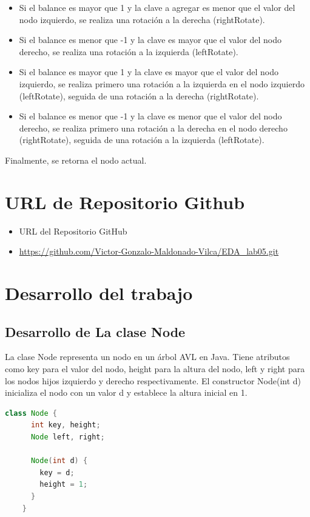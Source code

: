 \documentclass{article}
\begin{document}
\begin{enumerate}
\begin{enumerate}
        \begin{itemize}
          \item Si el balance es mayor que 1 y la clave a agregar es menor que el valor del nodo izquierdo, se realiza una rotación a la derecha (rightRotate).
          \item Si el balance es menor que -1 y la clave es mayor que el valor del nodo derecho, se realiza una rotación a la izquierda (leftRotate).
          \item Si el balance es mayor que 1 y la clave es mayor que el valor del nodo izquierdo, se realiza primero una rotación a la izquierda en el nodo izquierdo (leftRotate), seguida de una rotación a la derecha (rightRotate).
          \item Si el balance es menor que -1 y la clave es menor que el valor del nodo derecho, se realiza primero una rotación a la derecha en el nodo derecho (rightRotate), seguida de una rotación a la izquierda (leftRotate).
        \end{itemize}
    \end{enumerate}
  \end{enumerate}
  Finalmente, se retorna el nodo actual.
  

	\section{URL de Repositorio Github}
  \begin{itemize}
    \item URL del Repositorio GitHub
    \item \url{https://github.com/Victor-Gonzalo-Maldonado-Vilca/EDA_lab05.git}
  \end{itemize}


	\section{Desarrollo del trabajo}
  

  \subsection{Desarrollo de La clase Node}
  La clase Node representa un nodo en un árbol AVL en Java. Tiene atributos como key para el valor del nodo, 
  height para la altura del nodo, left y right para los nodos hijos izquierdo y derecho respectivamente. 
  El constructor Node(int d) inicializa el nodo con un valor d y establece la altura inicial en 1.
  \begin{lstlisting}[language=Java, caption={Ejemplo de código Java}]
    class Node {
      int key, height;
      Node left, right;

      Node(int d) {
        key = d;
        height = 1;
      }
    }
  \end{lstlisting}
  
\end{document}
